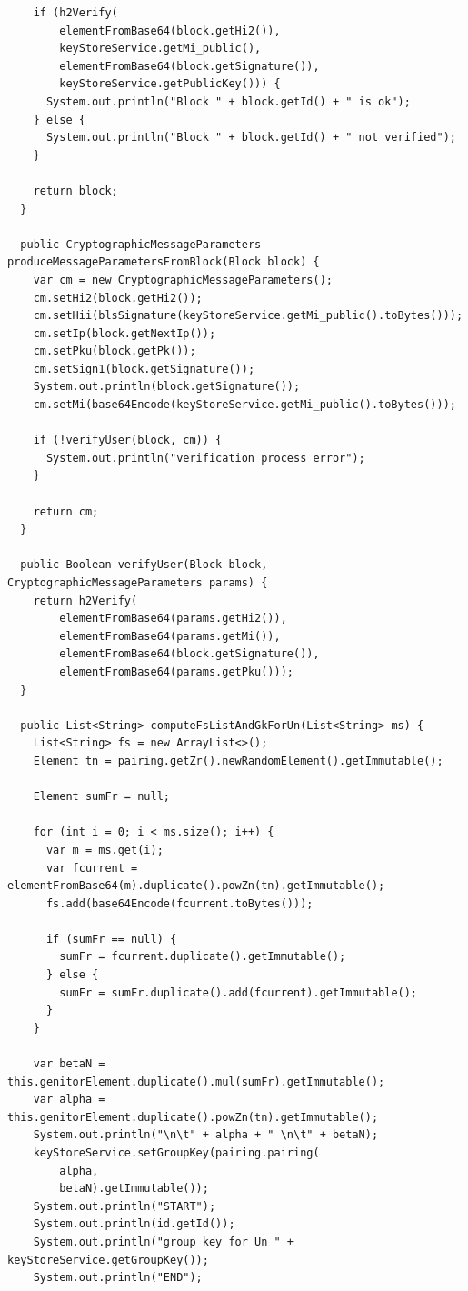 \documentclass[12pt,a4paper]{report}
\begin{document}
\begin{verbatim}
    if (h2Verify(
        elementFromBase64(block.getHi2()),
        keyStoreService.getMi_public(),
        elementFromBase64(block.getSignature()),
        keyStoreService.getPublicKey())) {
      System.out.println("Block " + block.getId() + " is ok");
    } else {
      System.out.println("Block " + block.getId() + " not verified");
    }

    return block;
  }

  public CryptographicMessageParameters produceMessageParametersFromBlock(Block block) {
    var cm = new CryptographicMessageParameters();
    cm.setHi2(block.getHi2());
    cm.setHii(blsSignature(keyStoreService.getMi_public().toBytes()));
    cm.setIp(block.getNextIp());
    cm.setPku(block.getPk());
    cm.setSign1(block.getSignature());
    System.out.println(block.getSignature());
    cm.setMi(base64Encode(keyStoreService.getMi_public().toBytes()));

    if (!verifyUser(block, cm)) {
      System.out.println("verification process error");
    }

    return cm;
  }

  public Boolean verifyUser(Block block, CryptographicMessageParameters params) {
    return h2Verify(
        elementFromBase64(params.getHi2()),
        elementFromBase64(params.getMi()),
        elementFromBase64(block.getSignature()),
        elementFromBase64(params.getPku()));
  }

  public List<String> computeFsListAndGkForUn(List<String> ms) {
    List<String> fs = new ArrayList<>();
    Element tn = pairing.getZr().newRandomElement().getImmutable();

    Element sumFr = null;

    for (int i = 0; i < ms.size(); i++) {
      var m = ms.get(i);
      var fcurrent = elementFromBase64(m).duplicate().powZn(tn).getImmutable();
      fs.add(base64Encode(fcurrent.toBytes()));

      if (sumFr == null) {
        sumFr = fcurrent.duplicate().getImmutable();
      } else {
        sumFr = sumFr.duplicate().add(fcurrent).getImmutable();
      }
    }

    var betaN = this.genitorElement.duplicate().mul(sumFr).getImmutable();
    var alpha = this.genitorElement.duplicate().powZn(tn).getImmutable();
    System.out.println("\n\t" + alpha + " \n\t" + betaN);
    keyStoreService.setGroupKey(pairing.pairing(
        alpha,
        betaN).getImmutable());
    System.out.println("START");
    System.out.println(id.getId());
    System.out.println("group key for Un " + keyStoreService.getGroupKey());
    System.out.println("END");


\end{verbatim}
\end{document}
